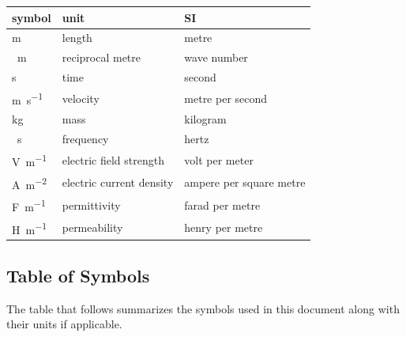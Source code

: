 \documentclass[12pt]{article}
\begin{document}
	\renewcommand{\arraystretch}{1.2} %
	\noindent \begin{tabular}{l l l} \toprule \textbf{symbol} & \textbf{unit} &
		\textbf{SI}\\ \midrule \si{\m} & length & metre\\ \si{\per \meter} & reciprocal
		metre & wave number\\ \si{\second} & time & second\\ \si{\meter \per \second} &
		velocity & metre per second\\ \si{\kilogram} & mass	& kilogram\\ \si{\per
			\second} & frequency& hertz\\ \si{\volt \per \meter} & electric field strength
		& volt per meter\\ \si{\ampere \per \square \meter} & electric current density
		& ampere per square metre\\ \si{\farad \per \meter} & permittivity & farad per
		metre\\ \si{\henry \per \meter} & permeability & henry per metre\\ \bottomrule
	\end{tabular} %
	
	
	\subsection{Table of Symbols}
	
	The table that follows summarizes the symbols used in this document along with
	their units if applicable.
	
\end{document}
